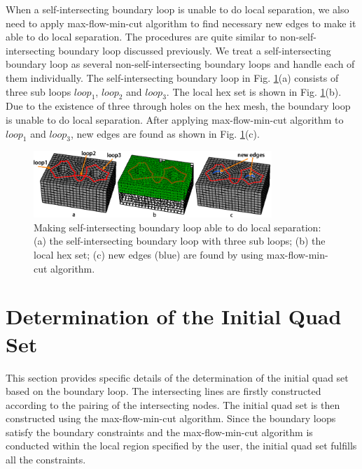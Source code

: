 \documentclass[final,5p,times,twocolumn]{elsarticle}
\begin{document}
When a self-intersecting boundary loop is unable to do local separation, we also need to apply max-flow-min-cut algorithm to find necessary new edges to make it able to do local separation. The procedures are quite similar to non-self-intersecting boundary loop discussed previously. We treat a self-intersecting boundary loop as several non-self-intersecting boundary loops and handle each of them individually. The self-intersecting boundary loop in Fig. \ref{fig:int_loop_local_sep}(a) consists of three sub loops $loop_1$, $loop_2$ and $loop_3$. The local hex set is shown in Fig. \ref{fig:int_loop_local_sep}(b). Due to the existence of three through holes on the hex mesh, the boundary loop is unable to do local separation. After applying max-flow-min-cut algorithm to $loop_1$ and $loop_3$, new edges are found as shown in Fig. \ref{fig:int_loop_local_sep}(c).

\begin{figure}[htbp]
\begin{center}
\includegraphics[width=9cm]{figures/int_loop_local_sep.png}
\caption{Making self-intersecting boundary loop able to do local separation: (a) the self-intersecting boundary loop with three sub loops; (b) the local hex set; (c) new edges (blue) are found by using max-flow-min-cut algorithm.}
\label{fig:int_loop_local_sep}
\end{center}
\end{figure}

\section{Determination of the Initial Quad Set}
\label{sec:det_quad_set}
This section provides specific details of the determination of the initial quad set based on the boundary loop. The intersecting lines are firstly constructed according to the pairing of the intersecting nodes. The initial quad set is then constructed using the max-flow-min-cut algorithm. Since the boundary loops satisfy the boundary constraints and the max-flow-min-cut algorithm is conducted within the local region specified by the user, the initial quad set fulfills all the constraints.
\end{document}
